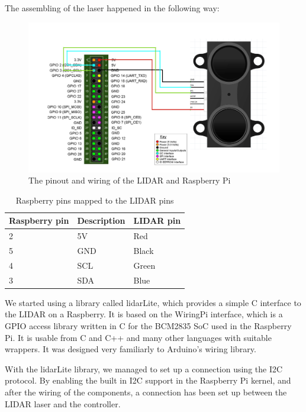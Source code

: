 
The assembling of the laser happened in the following way:

\begin{figure}[H]
	\centering
	\includegraphics[scale=.4]{images/laderraspberryconnection.png}
	\caption{The pinout and wiring of the LIDAR and Raspberry Pi}
	\label{fig:wiringlidarpi}
\end{figure}

\begin{table}[H]
	\centering
	\begin{tabular}{|l|l|l|}
		\hline
		\textbf{Raspberry pin} & \textbf{Description} & \textbf{LIDAR pin} \\ \hline
		2 & 5V & Red \\ \hline
		5 & GND & Black \\ \hline
		4 & SCL & Green \\ \hline
		3 & SDA & Blue \\ \hline
	\end{tabular}
	\caption{Raspberry pins mapped to the LIDAR pins}
\end{table}

We started using a library called lidarLite, which provides a simple C interface to the LIDAR on a Raspberry. It is based on the WiringPi interface, which is a GPIO access library written in C for the BCM2835 SoC used in the Raspberry Pi. It is usable from C and C++ and many other languages with suitable wrappers. It was designed very familiarly to Arduino's wiring library.

With the lidarLite library, we managed to set up a connection using the I2C protocol. By enabling the built in I2C support in the Raspberry Pi kernel, and after the wiring of the components, a connection has been set up between the LIDAR laser and the controller.

